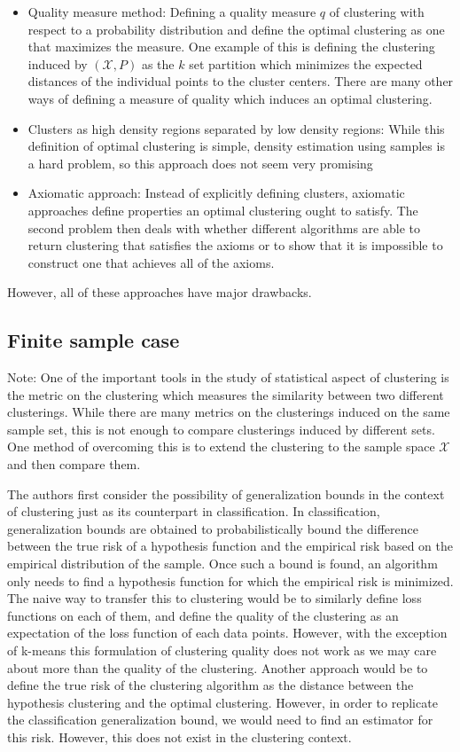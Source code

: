 \begin{itemize}
    \item Quality measure method: Defining a quality measure $q$ of clustering with respect to a probability distribution and define the optimal clustering as one that maximizes the measure. One example of this is defining the clustering induced by $(\mathcal{X}, P)$ as the $k$ set partition which minimizes the expected distances of the individual points to the cluster centers. There are many other ways of defining a measure of quality which induces an optimal clustering.
    \item Clusters as high density regions separated by low density regions: While this definition of optimal clustering is simple, density estimation using samples is a hard problem, so this approach does not seem very promising
    \item Axiomatic approach: Instead of explicitly defining clusters, axiomatic approaches define properties an optimal clustering ought to satisfy. The second problem then deals with whether different algorithms are able to return clustering that satisfies the axioms or to show that it is impossible to construct one that achieves all of the axioms.
\end{itemize}

However, all of these approaches have major drawbacks.

\subsection{Finite sample case}

Note: One of the important tools in the study of statistical aspect of clustering is the metric on the clustering which measures the similarity between two different clusterings. While there are many metrics on the clusterings induced on the same sample set, this is not enough to compare clusterings induced by different sets. One method of overcoming this is to extend the clustering to the sample space $\mathcal{X}$ and then compare them.

The authors first consider the possibility of generalization bounds in the context of clustering just as its counterpart in classification. In classification, generalization bounds are obtained to probabilistically bound the difference between the true risk of a hypothesis function and the empirical risk based on the empirical distribution of the sample. Once such a bound is found, an algorithm only needs to find a hypothesis function for which the empirical risk is minimized. The naive way to transfer this to clustering would be to similarly define loss functions on each of them, and define the quality of the clustering as an expectation of the loss function of each data points. However, with the exception of k-means this formulation of clustering quality does not work as we may care about more than the quality of the clustering. Another approach would be to define the true risk of the clustering algorithm as the distance between the hypothesis clustering and the optimal clustering. However, in order to replicate the classification generalization bound, we would need to find an estimator for this risk. However, this does not exist in the clustering context.

